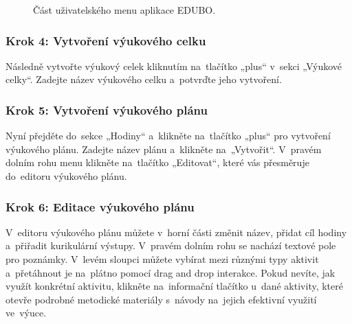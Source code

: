 \documentclass[male,czech,api_bc]{kitheses}
\begin{document}
\begin{figure}[H]
	\centering
	\caption{Část uživatelského menu aplikace EDUBO.}
	\label{fig:manual-1}
\end{figure}

\subsubsection{Krok 4: Vytvoření výukového celku}
Následně vytvořte výukový celek kliknutím na~tlačítko „plus“ v~sekci „Výukové celky“. Zadejte název výukového celku a~potvrďte jeho vytvoření.

\subsubsection{Krok 5: Vytvoření výukového plánu}
Nyní přejděte do~sekce „Hodiny“ a~klikněte na~tlačítko „plus“ pro vytvoření výukového plánu. Zadejte název plánu a~klikněte na~„Vytvořit“. V~pravém dolním rohu menu klikněte na~tlačítko „Editovat“, které vás přesměruje do~editoru výukového plánu.

\subsubsection{Krok 6: Editace výukového plánu}
V~editoru výukového plánu můžete v~horní části změnit název, přidat cíl hodiny a~přiřadit kurikulární výstupy. V~pravém dolním rohu se nachází textové pole pro poznámky. V~levém sloupci můžete vybírat mezi různými typy aktivit a~přetáhnout je na~plátno pomocí drag and drop interakce. Pokud nevíte, jak využít konkrétní aktivitu, klikněte na~informační tlačítko u~dané aktivity, které otevře podrobné metodické materiály s~návody na~jejich efektivní využití ve~výuce.
\end{document}
